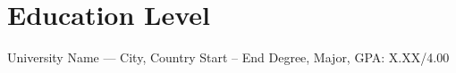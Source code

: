 \section{Education Level}
\entry
{University Name --- City, Country}
{Start -- End}
{Degree, Major, GPA: X.XX/4.00}

